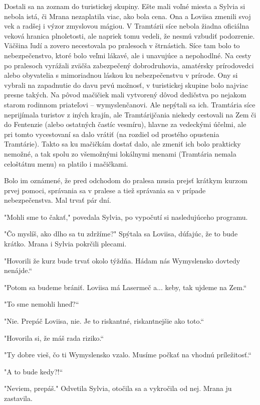 \documentclass{book}
\begin{document}
Dostali sa na zoznam do turistickej skupiny. Ešte mali voľné miesta a Sylvia si nebola istá, či Mrana nezaplatila viac, ako bola cena. Ona a Loviisa zmenili svoj vek a radšej i výzor zmyslovou mágiou. V Tramtárii síce nebola žiadna oficiálna veková hranica plnoletosti, ale napriek tomu vedeli, že nesmú vzbudiť podozrenie. Väčšina ľudí a zovero necestovala po pralesoch v štrnástich. Síce tam bolo to nebezpečenstvo, ktoré bolo veľmi lákavé, ale i unavujúce a nepohodlné. Na cesty po pralesoch vyrážali zväčša zabezpečený dobrodruhovia, amatérsky prírodovedci alebo obyvatelia s mimoriadnou láskou ku nebezpečenstvu v prírode. Ony si vybrali na zapadnutie do davu prvú možnosť, v turistickej skupine bolo najviac presne takých. Na pôvod mačičiek mali vytvorený dôvod dedičstva po nejakom starom rodinnom priateľovi – wymyslenčanovi. Ale nepýtali sa ich. Tramtária síce neprijímala turistov z iných krajín, ale Tramtárijčania niekedy cestovali na Zem či do Fentenzie (alebo ostatných častíc vesmíru), hlavne za vedeckými účelmi, ale pri tomto vycestovaní sa dalo vrátiť (na rozdiel od prostého opustenia Tramtárie). Takto sa ku mačičkám dostať dalo, ale zmeniť ich bolo prakticky nemožné, a tak spolu zo všemožnými lokálnymi menami (Tramtária nemala celoštátnu menu) sa platilo i mačičkami.

Bolo im oznámené, že pred odchodom do pralesa musia prejsť krátkym kurzom prvej pomoci, správania sa v pralese a tiež správania sa v prípade nebezpečenstva. Mal trvať pár dní.

"$ $Mohli sme to čakať,"$ $ povedala Sylvia, po vypočutí si nasledujúceho programu.

"$ $Čo myslíš, ako dlho sa tu zdržíme?"$ $ Spýtala sa Loviisa, dúfajúc, že to bude krátko. Mrana i Sylvia pokrčili plecami.

"$ $Hovorili že kurz bude trvať okolo týždňa. Hádam nás Wymyslensko dovtedy nenájde.“

"$ $Potom sa budeme brániť. Loviisa má Lasermeč a... keby, tak ujdeme na Zem.“

"$ $To sme nemohli hneď?“

"$ $Nie. Prepáč Loviisa, nie. Je to riskantné, riskantnejšie ako toto.“

"$ $Hovorila si, že máš rada riziko.“

"$ $Ty dobre vieš, čo ti Wymyslensko vzalo. Musíme počkať na vhodnú príležitosť.“

"$ $A to bude kedy?!“

"$ $Neviem, prepáš."$ $ Odvetila Sylvia, otočila sa a vykročila od nej. Mrana ju zastavila.
\end{document}
